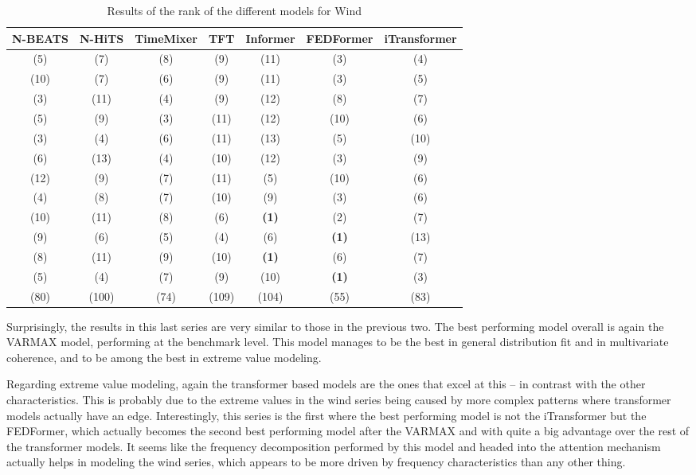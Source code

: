 \begin{table}[ht]
    \footnotesize
    \begin{flushright}
    \begin{tabular}[r]{|ccc|cccc}
        \toprule
        N-BEATS&N-HiTS&TimeMixer&TFT&Informer&FEDFormer&iTransformer \\
        \midrule            
        (5)&(7)&(8)&(9)&(11)&(3)&(4) \\
        (10)&(7)&(6)&(9)&(11)&(3)&(5) \\
        (3)&(11)&(4)&(9)&(12)&(8)&(7) \\
        \midrule
        (5)&(9)&(3)&(11)&(12)&(10)&(6) \\
        (3)&(4)&(6)&(11)&(13)&(5)&(10) \\
        (6)&(13)&(4)&(10)&(12)&(3)&(9) \\
        \midrule
        (12)&(9)&(7)&(11)&(5)&(10)&(6) \\
        (4)&(8)&(7)&(10)&(9)&(3)&(6) \\
        (10)&(11)&(8)&(6)&\textbf{(1)}&(2)&(7) \\
        (9)&(6)&(5)&(4)&(6)&\textbf{(1)}&(13) \\
        (8)&(11)&(9)&(10)&\textbf{(1)}&(6)&(7) \\
        (5)&(4)&(7)&(9)&(10)&\textbf{(1)}&(3) \\
        \bottomrule
        (80)&(100)&(74)&(109)&(104)&(55)&(83) \\
        \bottomrule
    \end{tabular}
    \end{flushright}
    \caption{Results of the rank of the different models for Wind\label{long}}
    \label{table:results-rank-wind}
\end{table}

Surprisingly, the results in this last series are very similar to those in the previous two. The best performing model overall is again the VARMAX model, performing at the benchmark level. This model manages to be the best in general distribution fit and in multivariate coherence, and to be among the best in extreme value modeling. 

Regarding extreme value modeling, again the transformer based models are the ones that excel at this -- in contrast with the other characteristics. This is probably due to the extreme values in the wind series being caused by more complex patterns where transformer models actually have an edge. Interestingly, this series is the first where the best performing model is not the iTransformer but the FEDFormer, which actually becomes the second best performing model after the VARMAX and with quite a big advantage over the rest of the transformer models. It seems like the frequency decomposition performed by this model and headed into the attention mechanism actually helps in modeling the wind series, which appears to be more driven by frequency characteristics than any other thing. 

